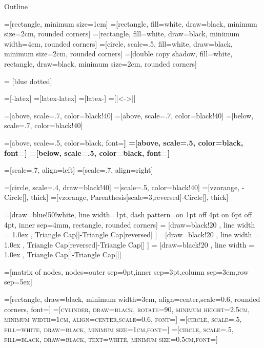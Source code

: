 \documentclass[smaller]{beamer}
\author{Vittorio Zaccaria}
\date{\today}
\title{}
\begin{document}
\begin{frame}{Outline}
\tableofcontents
\end{frame}

=[rectangle, minimum size=1cm]
=[rectangle, fill=white, draw=black, minimum size=2cm, rounded corners]
=[rectangle, fill=white, draw=black, minimum width=4cm, rounded corners]
=[circle, scale=.5, fill=white, draw=black, minimum size=2cm, rounded corners]
=[double copy shadow, fill=white, rectangle, draw=black, minimum size=2cm, rounded corners]

 = [blue dotted]

=[-latex]
=[latex-latex]
=[latex-]
=[|<->|]

     =[above, scale=.7, color=black!40]
=[above, scale=.7, color=black!40]
=[below, scale=.7, color=black!40]

     =[above, scale=.5, color=black, font=\ttfamily\bfseries]
=[above, scale=.5, color=black, font=\ttfamily\bfseries]
=[below, scale=.5, color=black, font=\ttfamily\bfseries]

      =[scale=.7, align=left]
     =[scale=.7, align=right]

=[circle, scale=.4, draw=black!40]
=[scale=.5, color=black!40]
=[vzorange, -{Circle[]}, thick]
=[vzorange, {Parenthesis[scale=3,reversed]}-{Circle[]}, thick]

=[draw=blue!50!white, line width=1pt, dash pattern=on 1pt off 4pt on 6pt off 4pt, inner sep=4mm, rectangle, rounded corners]
= [draw=black!20 , line width = 1.0ex , {Triangle Cap[]}-{Triangle Cap[reversed]} ]
=[draw=black!20 , line width = 1.0ex , {Triangle Cap[reversed]}-{Triangle Cap[]} ]
=   [draw=black!20 , line width = 1.0ex , {Triangle Cap[]}-{Triangle Cap[]}]

=[matrix of nodes, nodes={outer sep=0pt,inner sep=3pt},column sep=3em,row sep=5ex]

=[rectangle, draw=black, minimum width=3cm, align=center,scale=0.6, rounded corners, font=\small\scshape]
=[cylinder, draw=black, rotate=90, minimum height=2.5cm, minimum width=1cm, align=center,scale=0.6, font=\small\scshape]
=[circle, scale=.5, fill=white, draw=black, minimum size=1cm,font=\scshape]
=[circle, scale=.5, fill=black, draw=black, text=white, minimum size=0.5cm,font=\scshape]
\end{document}
